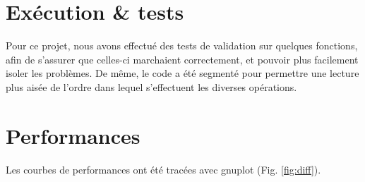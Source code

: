 \section{Exécution \& tests} %
\label{sec:execution}

Pour ce projet, nous avons effectué des tests de validation sur quelques fonctions, afin de s'assurer que celles-ci marchaient correctement, et pouvoir plus facilement isoler les problèmes. 
De même, le code a été segmenté pour permettre une lecture plus aisée de l'ordre dans lequel s'effectuent les diverses opérations.

\section{Performances} %
\label{sec:perf}

Les courbes de performances ont été tracées avec gnuplot (Fig. \ref{fig:diff}).




